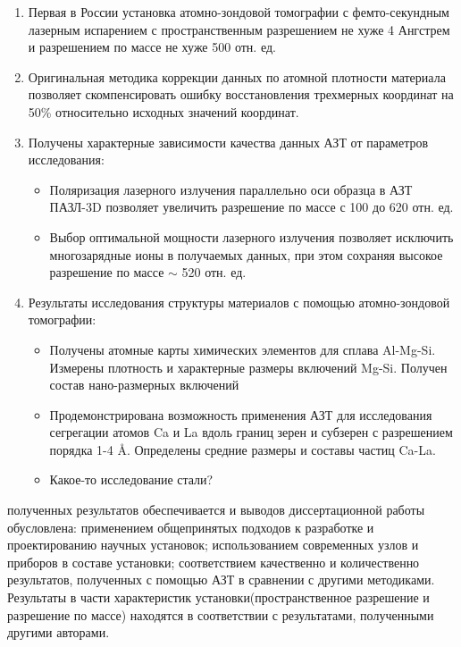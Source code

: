 \clearpage
{}
\begin{enumerate}[beginpenalty=10000] %
  \item Первая в России установка атомно-зондовой томографии с фемто-секундным лазерным испарением с пространственным разрешением не хуже 4 Ангстрем и разрешением по массе не хуже 500 отн. ед.
  \item Оригинальная методика коррекции данных по атомной плотности материала позволяет скомпенсировать ошибку восстановления трехмерных координат на 50\% относительно исходных значений координат.
  \item Получены характерные зависимости качества данных АЗТ от параметров исследования:
  \begin{itemize}
  	\item Поляризация лазерного излучения параллельно оси образца в АЗТ ПАЗЛ-3D позволяет увеличить разрешение по массе с 100 до 620 отн. ед.
  	\item Выбор оптимальной мощности лазерного излучения позволяет исключить многозарядные ионы в получаемых данных, при этом сохраняя высокое разрешение по массе $\sim$ 520 отн. ед.
  	\end{itemize}      
  \item Результаты исследования структуры материалов с помощью атомно-зондовой томографии:
  \begin{itemize}
  	\item Получены атомные карты химических элементов для сплава Al-Mg-Si. Измерены плотность и характерные размеры включений Mg-Si. Получен состав нано-размерных включений
  	\item Продемонстрирована возможность применения АЗТ для исследования сегрегации атомов Ca и La вдоль границ зерен и субзерен с разрешением порядка 1-4 \r{A}. Определены средние размеры и составы частиц Ca-La.
  	\item Какое-то исследование стали?
  \end{itemize}
  
  
\end{enumerate}

{\reliability} полученных результатов обеспечивается и выводов диссертационной работы обусловлена: применением общепринятых подходов к разработке и проектированию научных установок; использованием современных узлов и приборов в составе установки; соответствием качественно и количественно результатов, полученных с помощью АЗТ в сравнении с другими методиками. Результаты в части характеристик установки(пространственное разрешение и разрешение по массе) находятся в соответствии с результатами, полученными другими авторами.



